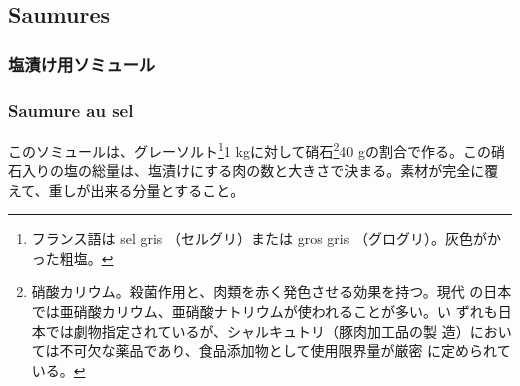 \vspace*{-2\zw}

\hypertarget{saumures}{%
\subsection{Saumures}\label{saumures}}
\begin{recette}
\hypertarget{ux5869ux6f2cux3051ux7528ux30bdux30dfux30e5ux30fcux30eb}{%
\subsubsection{塩漬け用ソミュール}\label{ux5869ux6f2cux3051ux7528ux30bdux30dfux30e5ux30fcux30eb}}

\hypertarget{saumure-au-sel}{%
\subsubsection{Saumure au sel}\label{saumure-au-sel}}

このソミュールは、グレーソルト\footnote{フランス語は sel gris
  （セルグリ）または gros gris （グログリ）。灰色がかった粗塩。}1
kgに対して硝石\footnote{硝酸カリウム。殺菌作用と、肉類を赤く発色させる効果を持つ。現代
  の日本では亜硝酸カリウム、亜硝酸ナトリウムが使われることが多い。い
  ずれも日本では劇物指定されているが、シャルキュトリ（豚肉加工品の製
  造）においては不可欠な薬品であり、食品添加物として使用限界量が厳密
  に定められている。}40
gの割合で作る。この硝石入りの塩の総量は、塩漬けにする肉の数と大きさで決まる。素材が完全に覆えて、重しが出来る分量とすること。
\end{recette}